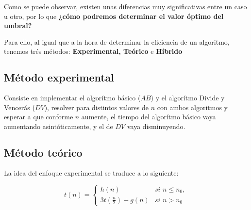 \documentclass[10pt,a4paper,spanish]{report}
\theoremstyle{definition}
\theoremstyle{remark}
\begin{document}
Como se puede observar, existen unas diferencias muy significativas entre un caso u otro, por lo que \textbf{¿cómo podremos determinar el valor óptimo del umbral?}

Para ello, al igual que a la hora de determinar la eficiencia de un algoritmo, tenemos trés métodos: \textbf{\textcolor[rgb]{0.2,0.5,0.5}{Experimental}, \textcolor[rgb]{0.2,0.5,0.5}{Teórico}} e \textbf{\textcolor[rgb]{0.2,0.5,0.5}{Híbrido}}

\subsection{\textcolor[rgb]{0.2,0.5,0.5}Método experimental}

Consiste en implementar el algorítmo básico ($AB$) y el algorítmo Divide y Vencerás ($DV$), resolver para distintos valores de $n$ con ambos algoritmos y esperar a que conforme $n$ aumente, el tiempo del algorítmo básico vaya aumentando asintóticamente, y el de $DV$ vaya disminuyendo.


\begin{center}
\end{center}

\subsection{\textcolor[rgb]{0.2,0.5,0.5}Método teórico}

La idea del enfoque experimental se traduce a lo siguiente:

\begin{equation*}
t(n) = 
\begin{cases}
h(n) & \textit{si } n \leq n_0, \\
3t(\frac{n}{2}) + g(n) & \textit{si } n> n_0
\end{cases}
\end{equation*}
\end{document}

